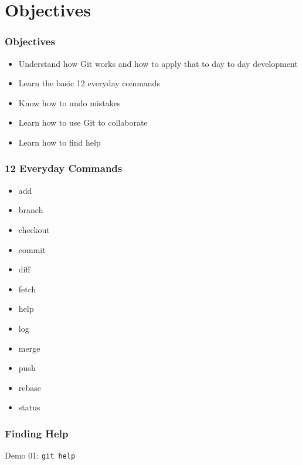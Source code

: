 \section[Section]{Objectives}

\begin{frame}
    \frametitle{Objectives}
    \begin{itemize}
        \item Understand how Git works and how to apply that to day to day
              development
        \item Learn the basic 12 everyday commands
        \item Know how to undo mistakes
        \item Learn how to use Git to collaborate
        \item Learn how to find help
    \end{itemize}
\end{frame}

\begin{frame}
    \frametitle{12 Everyday Commands}
    \begin{multicols}{3}
        \begin{itemize}
            \setlength\itemsep{3em}
            \item add
            \item branch
            \item checkout
            \item commit
            \item diff
            \item fetch
            \item help
            \item log
            \item merge
            \item push
            \item rebase
            \item status
        \end{itemize}
    \end{multicols}
\end{frame}

\begin{frame}
    \frametitle{Finding Help}
    \alert{Demo 01}: \texttt{git help}
\end{frame}

